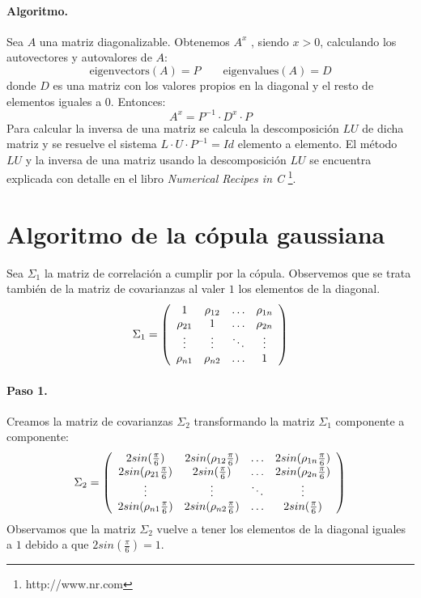 \paragraph{Algoritmo.}
Sea $A$ una matriz diagonalizable. Obtenemos $A^x$ , siendo $x > 0$, calculando
los autovectores y autovalores de $A$:
\begin{displaymath}
\textrm{eigenvectors}(A) = P \qquad \textrm{eigenvalues}(A) = D
\end{displaymath}
donde $D$ es una matriz con los valores propios en la diagonal y el resto de
elementos iguales a $0$. Entonces:
\begin{displaymath}
A^x = P^{-1} \cdot D^x \cdot P
\end{displaymath}
Para calcular la inversa de una matriz se calcula la descomposici\'on $LU$ de
dicha matriz y se resuelve el sistema $L \cdot U \cdot P^{-1} = Id$ elemento
a elemento. El m\'etodo $LU$ y la inversa de una matriz usando la descomposici\'on
$LU$ se encuentra explicada con detalle en el libro \emph{Numerical Recipes in C}
\footnote{http://www.nr.com}.


\section{Algoritmo de la c\'opula gaussiana}
\label{apendix:gaussiancopula}

 Sea $\Sigma_1$ la matriz de correlaci\'on a cumplir
por la c\'opula. Observemos que se trata tambi\'en de la matriz de covarianzas
al valer $1$ los elementos de la diagonal.
\begin{displaymath}
\Sigma_1 = \left( 
\begin{array}{cccc}
1          & \rho_{12} & \ldots & \rho_{1n} \cr
\rho_{21} & 1          & \ldots & \rho_{2n} \cr
\vdots    & \vdots    & \ddots & \vdots   \cr
\rho_{n1} & \rho_{n2} & \ldots & 1
\end{array}
\right)
\end{displaymath}

\paragraph{Paso 1.} Creamos la matriz de covarianzas $\Sigma_2$ transformando 
la matriz $\Sigma_1$ componente a componente:
\begin{displaymath}
\Sigma_2 = \left( 
\begin{array}{cccc}
2 sin(\frac{\pi}{6})           & 2 sin(\rho_{12} \frac{\pi}{6}) & \ldots & 2 sin(\rho_{1n} \frac{\pi}{6})\cr
2 sin(\rho_{21} \frac{\pi}{6}) & 2 sin(\frac{\pi}{6})           & \ldots & 2 sin(\rho_{2n} \frac{\pi}{6})\cr
\vdots                          & \vdots                          & \ddots  & \vdots   \cr
2 sin(\rho_{n1} \frac{\pi}{6}) & 2 sin(\rho_{n2} \frac{\pi}{6}) & \ldots & 2 sin(\frac{\pi}{6})
\end{array}
\right)
\end{displaymath}
Observamos que la matriz $\Sigma_2$ vuelve a tener los elementos de la
diagonal iguales a $1$ debido a que $2 sin(\frac{\pi}{6}) = 1$.

